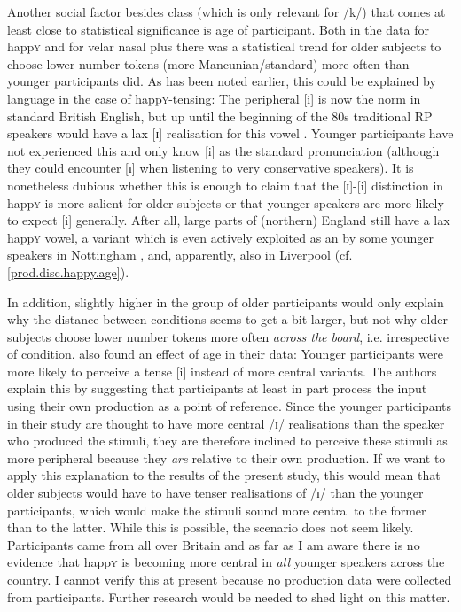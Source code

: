 Another social factor besides class (which is only relevant for /k/) that comes at least close to statistical significance is age of participant.
Both in the data for happ\textsc{y} and for velar nasal plus there was a statistical trend for older subjects to choose lower number tokens (more Mancunian/standard) more often than younger participants did.
As has been noted earlier, this could be explained by language  in the case of happ\textsc{y}-tensing: The peripheral [i] is now the norm in standard British English, but up until the beginning of the 80s traditional RP speakers would have a lax [ɪ] realisation for this vowel \parencite[cf.][]{harrington2006}.
Younger participants have not experienced this  and only know [i] as the standard pronunciation (although they could encounter [ɪ] when listening to very conservative speakers).
It is nonetheless dubious whether this is enough to claim that the [ɪ]-[i] distinction in happ\textsc{y} is more salient for older subjects or that younger speakers are more likely to expect [i] generally.
After all, large parts of (northern) England still have a lax happ\textsc{y} vowel, a variant which is even actively exploited as an   by some younger speakers in Nottingham \parencite[cf.][]{flynn2010}, and, apparently, also in Liverpool (cf. \ref{prod.disc.happy.age}).

In addition, slightly higher  in the group of older participants would only explain why the distance between  conditions seems to get a bit larger, but not why older subjects choose lower number tokens more often \emph{across the board}, i.e. irrespective of  condition.
\textcite[878--879]{haydrager2010} also found an effect of age in their data: Younger participants were more likely to perceive a tense [i] instead of more central variants.
The authors explain this by suggesting that participants at least in part process the input using their own production as a point of reference.
Since the younger participants in their study are thought to have more central /ɪ/ realisations than the speaker who produced the stimuli, they are therefore inclined to perceive these stimuli as more peripheral because they \emph{are} relative to their own production.
If we want to apply this explanation to the results of the present study, this would mean that older subjects would have to have tenser realisations of /ɪ/ than the younger participants, which would make the stimuli sound more central to the former than to the latter.
While this is possible, the scenario does not seem likely.
Participants came from all over Britain and as far as I am aware there is no evidence that happ\textsc{y} is becoming more central in \emph{all} younger speakers across the country.
I cannot verify this at present because no production data were collected from participants.
Further research would be needed to shed light on this matter.

